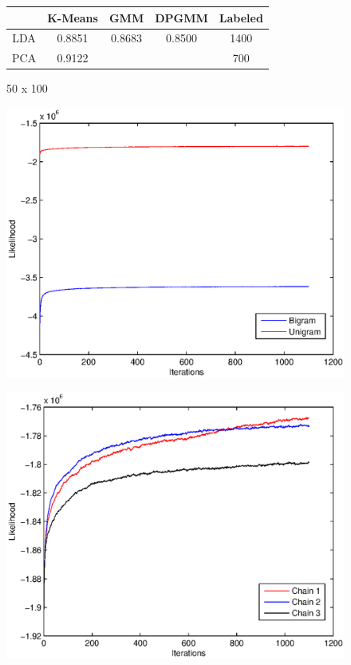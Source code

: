 \documentclass[11pt,a4paper]{article}
\begin{document}
	
	
	\begin{figure}
	\begin{center}
	\begin{tabular}{|c|c|c|c|c|}
		\hline
		 & K-Means & GMM & DPGMM & Labeled\\
		 \hline
		 LDA & 0.8851 & 0.8683 & 0.8500 & 1400  \\
		 \hline
		 PCA & 0.9122 & & & 700 \\
		 \hline
	\end{tabular}
	\caption{50 x 100}
	\end{center}
	\end{figure}
	
	
	\begin{figure}
		\begin{center}
			\includegraphics[scale=1.0]{lda_bigram_compare}
		\end{center}
	\end{figure}

	\begin{figure}
		\begin{center}
			\includegraphics[scale=1.0]{lda_plot}
		\end{center}
	\end{figure}
\end{document}
